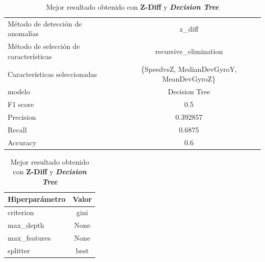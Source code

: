 \begin{appendices}
		\begin{table}[htb]
			\centering
			\caption{Mejor resultado obtenido con \textbf{Z-Diff} y \textbf{\emph{Decision Tree}}}
			\label{table:22}
			\begin{tabular}{lc}
				\toprule
					  Método de detección de anomalías &                                   z\_diff \\
				Método de selección de características &                    recursive\_elimination \\
						 Características seleccionadas & \{SpeedvsZ, MedianDevGyroY, MeanDevGyroZ\}\\
												modelo &                            Decision Tree \\
											  F1 score &                                      0.5 \\
											 Precision &                                 0.392857 \\
												Recall &                                   0.6875 \\
											  Accuracy &                                      0.6 \\
				\bottomrule
				\end{tabular}
			\newline
			\newline

			\begin{tabular}{lc}
				\toprule
				Hiperparámetro & Valor \\
				\midrule
					 criterion &  gini \\
					 max\_depth &  None \\
				  max\_features &  None \\
					  splitter &  best \\
				\bottomrule
			\end{tabular}
			
		\end{table}


\end{appendices}
